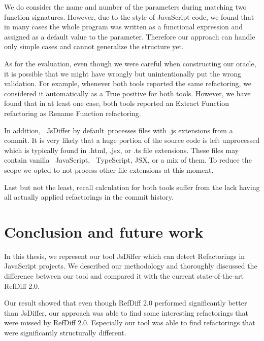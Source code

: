 \documentclass[letterpaper,12pt,onecolumn,final]{report}
\begin{document}
We do consider the name and number of the parameters during matching two function signatures. However,  due to the style of JavaScript code, we found that in many cases the whole program was written as a functional expression and assigned as a default value to the parameter. Therefore our approach can handle only simple cases and cannot generalize the structure yet.


As for the evaluation, even though we were careful when constructing our oracle, it is possible that we might have wrongly but unintentionally put the wrong validation. For example, whenever both tools reported the same refactoring, we considered it automatically as a True positive for both tools. However, we have found that in at least one case, both tools reported an Extract Function refactoring as Rename Function refactoring.

In addition,  JsDiffer by default processes files with .js extensions from a commit. It is very likely that a huge portion of the source code is left unprocessed which is typically found in .html, .jsx, or .ts file extensions. These files may contain vanilla  JavaScript,  TypeScript, JSX, or a mix of them. To reduce the scope we opted to not process other file extensions at this moment. 

Last but not the least, recall calculation for both tools suffer from the lack having all actually applied refactorings in the commit history.

\chapter{Conclusion and future work}
\label{chap:conclusion}

In this thesis, we represent our tool JsDiffer which can detect Refactorings in JavaScript projects. We described our methodology and thoroughly discussed the difference between our tool and compared it with the current state-of-the-art RefDiff 2.0.

Our result showed that even though RefDiff 2.0 performed significantly better than JsDiffer, our approach was able to find some interesting refactorings that were missed by RefDiff 2.0. Especially our tool was able to find refactorings that were significantly structurally different. 
\end{document}
